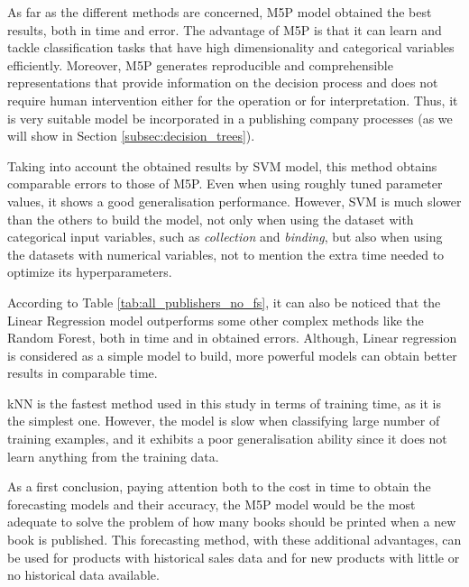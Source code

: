 \documentclass[a4paper,10pt,twocolumn,preprint,3p]{elsarticle}
\begin{document}
As far as the different methods are concerned, M5P model obtained the best results, both in time and error. The advantage of M5P is that it can learn and tackle classification tasks that have high dimensionality and categorical variables efficiently. Moreover, M5P generates reproducible and comprehensible representations that provide information on the decision process and does not require human intervention either for the operation or for interpretation. Thus, it is very suitable model be incorporated in a publishing company 
processes (as we will show in Section \ref{subsec:decision_trees}).

Taking into account the obtained results by SVM model, this method obtains comparable errors to those of M5P. Even when using roughly tuned parameter values, it shows a good generalisation performance. However, SVM is much slower than the others to build the model, not only when using the dataset with categorical input variables, such as \emph{collection} and \emph{binding}, but also when using the datasets with numerical variables, not to mention the extra time needed to optimize its hyperparameters.

According to Table \ref{tab:all_publishers_no_fs}, it can also be noticed that the Linear Regression model outperforms some other complex methods like the Random Forest, both in time and in obtained errors. Although, Linear regression is considered as a simple model to build, more powerful models can obtain better results in comparable time.

kNN is the fastest method used in this study in terms of training time, as it 
is the simplest one. However, the model is slow when classifying large number of 
training examples, and it exhibits a poor generalisation ability since it does not learn anything from the training data.


As a first conclusion, paying attention both to the cost in time to obtain the forecasting models and their accuracy, the M5P model would be the most adequate to solve the problem of how many books should be printed when a new book is published. This forecasting method, with these additional advantages, can be used for products with historical sales data and for new products with little or no historical data available.
\end{document}

